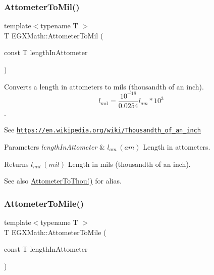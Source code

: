 \subsubsection{\texorpdfstring{Attometer\+To\+Mil()}{AttometerToMil()}}
{\footnotesize\ttfamily template$<$typename T $>$ \\
T E\+G\+X\+Math\+::\+Attometer\+To\+Mil (\begin{DoxyParamCaption}\item[{const T}]{length\+In\+Attometer }\end{DoxyParamCaption})}



Converts a length in attometers to mils (thousandth of an inch). \[ l_{mil}= \frac{10^{-18}}{0.0254} l_{am} * 10^{3} \]. 

See \href{https://en.wikipedia.org/wiki/Thousandth_of_an_inch}{\tt https\+://en.\+wikipedia.\+org/wiki/\+Thousandth\+\_\+of\+\_\+an\+\_\+inch} 
\begin{DoxyParams}{Parameters}
{\em length\+In\+Attometer} & $ l_{am}\ (am)$ Length in attometers. \\
\hline
\end{DoxyParams}
\begin{DoxyReturn}{Returns}
$ l_{mil}\ (mil)$ Length in mils (thousandth of an inch). 
\end{DoxyReturn}
\begin{DoxySeeAlso}{See also}
\mbox{\hyperlink{group___e_g_x_math-_conversions-_length_conversions-_attometer-_imperial_gac9c9742b80b24da4e531fbcdc39976bb}{Attometer\+To\+Thou()}} for alias. 
\end{DoxySeeAlso}
\mbox{\label{group___e_g_x_math-_conversions-_length_conversions-_attometer-_imperial_ga5525f722f588a2bb0a480c56d452fd3f}} 
\subsubsection{\texorpdfstring{Attometer\+To\+Mile()}{AttometerToMile()}}
{\footnotesize\ttfamily template$<$typename T $>$ \\
T E\+G\+X\+Math\+::\+Attometer\+To\+Mile (\begin{DoxyParamCaption}\item[{const T}]{length\+In\+Attometer }\end{DoxyParamCaption})}



